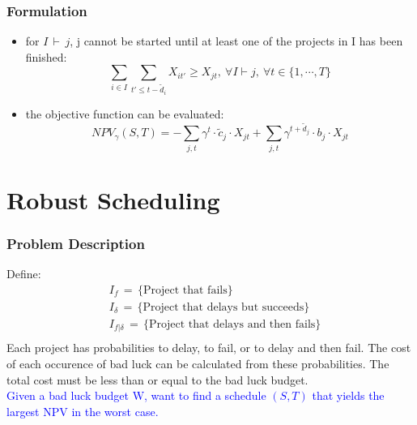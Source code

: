 \documentclass{beamer}
\newcommand{\tblue}{\textcolor{blue}}
\begin{document}
		\begin{frame}
			\frametitle{Formulation}
			\begin{itemize}
				\item for $I\,\vdash\,j$, j cannot be started until at least one of the projects in I has been finished:
					\begin{equation*}
						\label{EqnAnyPrecedence}
						\sum\limits_{i\in I}\sum\limits_{t'\leq t-\tilde{d}_i} X_{it'} \geq X_{jt},~\forall I \vdash j,~\forall t \in \{1,\cdots,T\}
					\end{equation*}
				\item the objective function can be evaluated:
					\begin{equation*}
						NPV_{\gamma}(S,T) = -\sum\limits_{j,t} \gamma^t \cdot \tilde{c}_j \cdot X_{jt} + \sum\limits_{j,t} \gamma^{t+\tilde{d}_j} \cdot b_j \cdot X_{jt}
					\end{equation*}
			\end{itemize}
		\end{frame}



\section{Robust Scheduling}
\begin{frame}
\frametitle{Problem Description}
Define:\\
\begin{align*}
	&I_f\,=\, \{\mbox{Project that fails}\}\\
	&I_{\delta}\,=\, \{\mbox{Project that delays but succeeds}\}\\
	&I_{f|\delta}\,=\, \{\mbox{Project that delays and then fails}\}\\
\end{align*}
Each project has probabilities to delay, to fail, or to delay and then fail. The cost of each occurence of bad luck can be calculated from these probabilities. The total cost must be less than or equal to the bad luck budget.\\
\medskip
\tblue{Given a bad luck budget W,  want to find a schedule $(S, T)$ that yields the largest NPV in the worst case.}
\end{frame}
\end{document}
